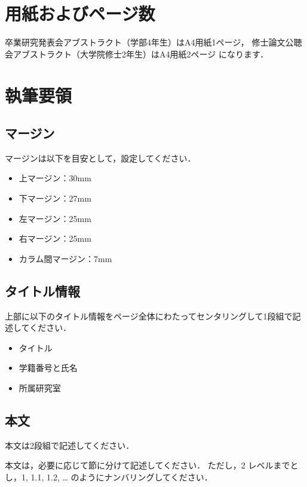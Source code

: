 \documentclass[a4paper]{jarticle}
\begin{document}
\small

\twocolumn[\vspace*{29mm}] %
\begin{論文概要}           %

\section{用紙およびページ数}
卒業研究発表会アブストラクト（学部4年生）はA4用紙1ページ，
修士論文公聴会アブストラクト（大学院修士2年生）はA4用紙2ページ
になります．

\section{執筆要領}

\subsection{マージン}
マージンは以下を目安として，設定してください．

\begin{itemize}
\item 上マージン：30mm
\item 下マージン：27mm
\item 左マージン：25mm
\item 右マージン：25mm
\item カラム間マージン：7mm
\end{itemize}

\subsection{タイトル情報}
上部に以下のタイトル情報をページ全体にわたってセンタリングして1段組で記述してください．

\begin{itemize}
\item タイトル
\item 学籍番号と氏名
\item 所属研究室
\end{itemize}

\subsection{本文}
本文は2段組で記述してください．

本文は，必要に応じて節に分けて記述してください．
ただし，2 レベルまでとし，1, 1.1, 1.2, … のようにナンバリングしてください．


\end{論文概要}
\end{document}
